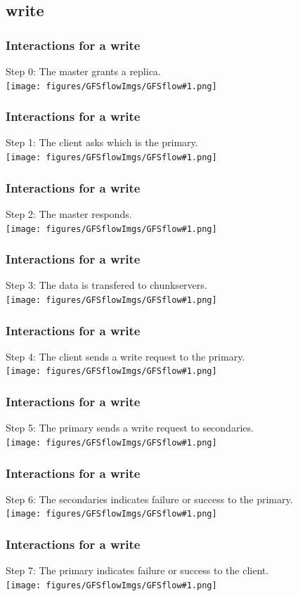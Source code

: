 \documentclass{beamer}
\begin{document}
\newcommand{\writeslide}[2]{\begin{frame}\frametitle{Interactions for a write}\alert{Step #1}: #2\vspace{0.3cm}\\\centering\texttt{[image: figures/GFSflowImgs/GFSflow\#1.png]}\end{frame}}
\subsection{write}
\writeslide{0}{The master grants a replica.}
\writeslide{1}{The client asks which is the primary.}
\writeslide{2}{The master responds.}
\writeslide{3}{The data is transfered to chunkservers.}
\writeslide{4}{The client sends a write request to the primary.}
\writeslide{5}{The primary sends a write request to secondaries.}
\writeslide{6}{The secondaries indicates failure or success to the primary.}
\writeslide{7}{The primary indicates failure or success to the client.}

\end{document}
